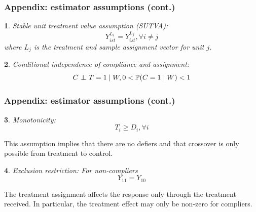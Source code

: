 \documentclass{beamer}
\makeatletter
\newtheorem*{assumption*}{\assumptionnumber}
\providecommand{\assumptionnumber}{}
\newenvironment{assumption}[2]
 {%
  \renewcommand{\assumptionnumber}{Assumption #1}%
  \begin{assumption*}%
  \protected@edef\@currentlabel{#1}%
 }
 {%
  \end{assumption*}
 }
\newcommand{\pr}{\mathbb{P}} %
\newcommand\independent{\protect\mathpalette{\protect\independenT}{\perp}}
\def\independenT#1#2{\mathrel{\rlap{$#1#2$}\mkern2mu{#1#2}}}
\makeatother
\begin{document}
\begin{frame}
\frametitle{Appendix: estimator assumptions (cont.)}
\begin{assumption}{4}{}\label{sutva}
Stable unit treatment value assumption (SUTVA):
\begin{equation*}
Y_{ist}^{L_i} = Y_{ist}^{L_j},  \forall i \neq j
\end{equation*}
where $L_j$ is the treatment and sample assignment vector for unit $j$. \end{assumption}
 
\begin{assumption}{5}{}\label{compl}
Conditional independence of compliance and assignment:
\begin{equation*}
C \independent T=1 \mid W, 0 < \pr(C = 1 \mid W) < 1
\end{equation*}
\end{assumption}
\end{frame}

\begin{frame}
\frametitle{Appendix: estimator assumptions (cont.)}
\begin{assumption}{6}{}\label{monotonicity}
Monotonicity: 
\begin{equation*}
T_i \geq D_i, \forall i
\end{equation*}
\end{assumption}
\noindent This assumption implies that there are no defiers and that crossover is only possible from treatment to control.
\begin{assumption}{7}{}\label{ER}
Exclusion restriction: For non-compliers
\begin{equation*}
Y_{11} = Y_{10}
\end{equation*}  
\end{assumption}
\noindent The treatment assignment affects the response only through the treatment received.  In particular, the treatment effect may only be non-zero for compliers.  
\end{frame}



		
\end{document}
